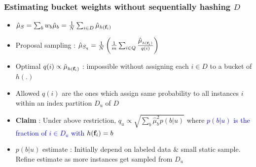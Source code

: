 \documentclass[usenames,dvipsnames, 11pt]{beamer}
\newcommand{\vek}[1]{{\bf {#1}}}
\newcommand{\vft}{{\vek{f}}}
\newcommand{\wt}{{p}}
\newcommand{\estSS}{{\mbox{$\hat{\mu}_S$}}}
\newcommand{\estSb}{{\mbox{$\hat{\mu}$}}}
\newlength{\wideitemsep}
\let\olditem\item
\renewcommand{\item}{\setlength{\itemsep}{\wideitemsep}\olditem}
\begin{document}
\begin{frame}
\frametitle{Estimating bucket weights without sequentially hashing $D$}
\begin{itemize}
\pause
\item $\estSS=\sum_b{w_b\hat{\mu}_b}=\frac{1}{N}\sum_{i \in D}\hat{\mu}_{h(\vft_i)}$
\pause
\item Proposal sampling : $\hat{\mu}_{S_q} = \frac{1}{N}\left(\frac{1}{m}\sum_{i\in Q} \frac{\estSb_{h(\vft_i)}}{q(i)}\right)$
\pause
\item Optimal $q(i) \propto \estSb_{h(\vft_i)}$ : impossible without assigning each $i \in D$ to a bucket of $h(.)$
\pause
\item Allowed $q(i)$ are the ones which assign same probability to all instances $i$ within an index partition $D_u$ of $D$
\pause
\item \textbf{Claim} : Under above restriction, $q_u \propto \sqrt{\sum_{b}\estSb^2_b\wt(b|u)}$ where \textcolor{Blue}{$\wt(b|u)$ is the fraction of  $i\in D_u$ with $h(\vft_i)=b$}
\pause
\item $\wt(b|u)$ estimate : Initially depend on labeled data \& small static sample. Refine estimate as more instances get sampled from $D_u$
\end{itemize}
\end{frame}

\end{document}
